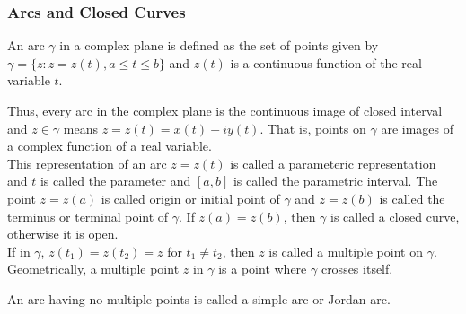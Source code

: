 \subsubsection{Arcs and Closed Curves}

\begin{definition}[arc]
	An arc $\gamma$ in a complex plane is defined as the set of points given by $\gamma = \{ z : z = z(t), a \le t \le b \}$ and $z(t)$ is a continuous function of the real variable $t$.
\end{definition}
	Thus, every arc in the complex plane is the continuous image of closed interval and $z \in \gamma$ means $z = z(t) = x(t) + iy(t)$.
	That is, points on $\gamma$ are images of a complex function of a real variable.\\

	This representation of an arc $z = z(t)$ is called a parameteric representation and $t$ is called the parameter and $[a,b]$ is called the parametric interval.
	The point $z = z(a)$ is called origin or initial point of $\gamma$ and $z = z(b)$ is called the terminus or terminal point of $\gamma$.
	If $z(a) = z(b)$, then $\gamma$ is called a closed curve, otherwise it is open.\\

	If in $\gamma$, $z(t_1) = z(t_2) = z$ for $t_1 \ne t_2$, then $z$ is called a multiple point on $\gamma$.
	Geometrically, a multiple point $z$ in $\gamma$ is a point where $\gamma$ crosses itself.

	An arc having no multiple points is called a simple arc or Jordan arc.




